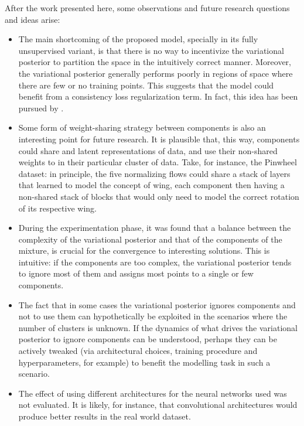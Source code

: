 After the work presented here, some observations and future research questions
and ideas arise:
\begin{itemize}
    \item The main shortcoming of the proposed model, specially in its fully
    unsupervised variant, is that there is no way to incentivize the variational
    posterior to partition the space in the intuitively correct manner. Moreover, the
    variational posterior generally performs poorly in regions of space where there are few
    or no training points. This suggests that the model could benefit from a consistency
    loss regularization term. In fact, this idea has been pursued by \textcite{semisuplearning_nflows}.
    \item Some form of weight-sharing strategy between components is also an interesting
    point for future research. It is plausible that, this way, components could
    share  and latent representations of data, and use their non-shared
    weights to  in their particular cluster of data. Take,
    for instance, the Pinwheel dataset: in principle, the five normalizing flows
    could share a stack of layers that learned to model the concept of wing,
    each component then having a non-shared stack of blocks that would only
    need to model the correct rotation of its respective wing.
    \item During the experimentation phase, it was found that a balance between
    the complexity of the variational posterior and that of the components of
    the mixture, is crucial for the convergence to interesting solutions. This
    is intuitive: if the components are too complex, the variational posterior
    tends to ignore most of them and assigns most points to a single or few components.
    \item The fact that in some cases the variational posterior ignores components
    and  not to use them can hypothetically be exploited in the scenarios
    where the number of clusters is unknown. If the dynamics of what drives the
    variational posterior to ignore components can be understood, perhaps they
    can be actively tweaked (via architectural choices, training procedure and
    hyperparameters, for example) to benefit the modelling task in such a scenario.
    \item The effect of using different architectures for the neural networks used
    was not evaluated. It is likely, for instance, that convolutional architectures
    would produce better results in the real world dataset.
\end{itemize}


